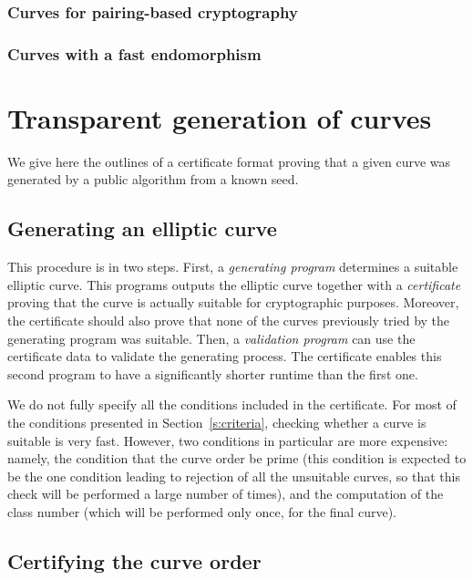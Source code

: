 \documentclass{article}
\begin{document}
\subsubsection{Curves for pairing-based cryptography}

\subsubsection{Curves with a fast endomorphism}


\section{Transparent generation of curves}

We give here the outlines of a certificate format
proving that a given curve was generated by a public algorithm
from a known seed.

\subsection{Generating an elliptic curve}

This procedure is in two steps.
First, a \emph{generating program} determines a suitable elliptic curve.
This programs outputs the elliptic curve
together with a \emph{certificate} proving that
the curve is actually suitable for cryptographic purposes.
Moreover, the certificate should also prove that
none of the curves previously tried by the generating program
was suitable.
Then, a \emph{validation program} can use the certificate data
to validate the generating process.
The certificate enables this second program
to have a significantly shorter runtime than the first one.

We do not fully specify all the conditions included in the certificate.
For most of the conditions presented in Section~\ref{s:criteria},
checking whether a curve is suitable is very fast.
However, two conditions in particular are more expensive:
namely, the condition that the curve order be prime
(this condition is expected to be the one condition
leading to rejection of all the unsuitable curves,
so that this check will be performed a large number of times),
and the computation of the class number
(which will be performed only once, for the final curve).

\subsection{Certifying the curve order}
\end{document}
